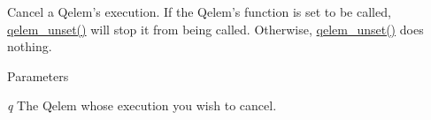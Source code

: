 Cancel a Qelem’s execution. If the Qelem’s function is set to be called, \hyperlink{group__qelems_ga021eca2eff6e47ff97ca112fb2eaf866}{qelem\_\-unset()} will stop it from being called. Otherwise, \hyperlink{group__qelems_ga021eca2eff6e47ff97ca112fb2eaf866}{qelem\_\-unset()} does nothing.


\begin{DoxyParams}{Parameters}
\item[{\em q}]The Qelem whose execution you wish to cancel. \end{DoxyParams}
